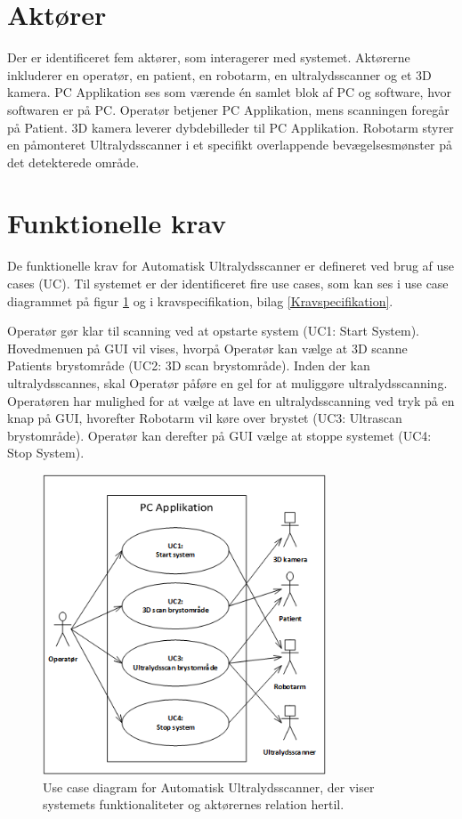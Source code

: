 \section{Aktører}
Der er identificeret fem aktører, som interagerer med systemet. Aktørerne inkluderer en operatør, en patient, en robotarm, en ultralydsscanner og et 3D kamera. PC Applikation ses som værende én samlet blok af PC og software, hvor softwaren er på PC. Operatør betjener PC Applikation, mens scanningen foregår på Patient. 3D kamera leverer dybdebilleder til PC Applikation. Robotarm styrer en påmonteret Ultralydsscanner i et specifikt overlappende bevægelsesmønster på det detekterede område.

\section{Funktionelle krav}
De funktionelle krav for Automatisk Ultralydsscanner er defineret ved brug af use cases (UC). Til systemet er der identificeret fire use cases, som kan ses i use case diagrammet på figur \ref{UseCaseDiagram} og i kravspecifikation, bilag \ref{Kravspecifikation}. 

Operatør gør klar til scanning ved at opstarte system (UC1: Start System). Hovedmenuen på GUI vil vises, hvorpå Operatør kan vælge at 3D scanne Patients brystområde (UC2: 3D scan brystområde). Inden der kan ultralydsscannes, skal Operatør påføre en gel for at muliggøre ultralydsscanning. Operatøren har mulighed for at vælge at lave en ultralydsscanning ved tryk på en knap på GUI, hvorefter Robotarm vil køre over brystet (UC3: Ultrascan brystområde).  Operatør kan derefter på GUI vælge at stoppe systemet (UC4: Stop System). 

\begin{figure}[H]
    \centering
    \includegraphics[width=0.75\textwidth]{figurer/d/Kravspecifikation/UseCaseDiagram}
    \caption{Use case diagram for Automatisk Ultralydsscanner, der viser systemets funktionaliteter og aktørernes relation hertil.}
    \label{UseCaseDiagram}
\end{figure}

